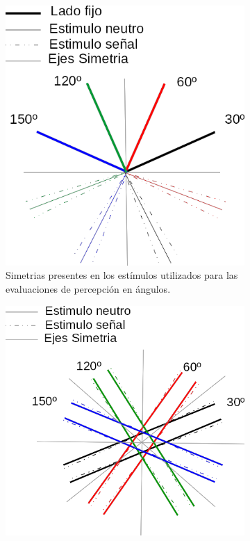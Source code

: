 \documentclass{article}
\begin{document}
    \begin{figure}
        \begin{subfigure}{.47\textwidth}
            \centering
            \includegraphics[width=\textwidth]{Imagenes/SimetriasOrientacionAngulos.png}
            \caption{Simetrias presentes en los estímulos utilizados para las evaluaciones de percepción en ángulos.}
        \end{subfigure}
        \begin{subfigure}{.53\textwidth}
            \centering
            \includegraphics[width=\textwidth]{Imagenes/SimetriasOrientacionParalelismo.png}

\end{subfigure}
\end{figure}
\end{document}
